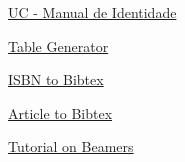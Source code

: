 \documentclass{uc-mse}
\begin{document}
\href{https://www.uc.pt/identidadevisual/}{UC - Manual de Identidade}

\href{https://www.tablesgenerator.com/}{Table Generator}

\href{https://www.bibtex.com/c/isbn-to-bibtex-converter/}{ISBN to Bibtex}

\href{https://www.bibme.org/bibtex}{Article to Bibtex}

\href{https://latex-beamer.com/quick-start/}{Tutorial on Beamers}
\end{document}
